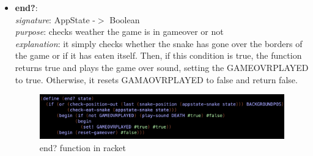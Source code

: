 \documentclass{article}
\begin{document}
\begin{itemize}
		\item \textbf{end?}: \\
			\emph{signature}: AppState -$>$ Boolean \\
			\emph{purpose}: checks weather the game is in gameover or not \\
			\emph{explanation}: it simply checks whether the snake has gone over the borders of the game or if it has eaten itself. Then, if this condition is true, the function returns true and plays the game over sound, setting the GAMEOVRPLAYED to true. Otherwise, it resets GAMAOVRPLAYED to false and return false.
			\begin{figure}[h!]
				\centering
				\includegraphics[width=.6\linewidth]{end.png}
				\caption{end? function in racket}
			\end{figure}
	\end{itemize}
\end{document}

